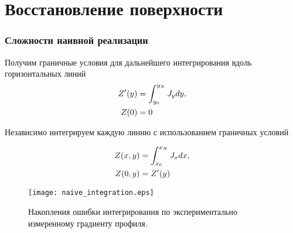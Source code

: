 \documentclass{beamer}
\begin{document}
\section{Восстановление поверхности}
\begin{frame}
    \sectionpage
\end{frame}

\begin{frame}[c,allowframebreaks]
    \frametitle{Сложности наивной реализации}

    Получим граничные условия для дальнейшего интегрирования вдоль горизонтальных линий
    \begin{equation*}
        \begin{aligned}
            Z'(y) & = \int_{y_0}^{y_N} \mathbf{\emph{J}}_y dy, \\
            Z(0)  & = 0
        \end{aligned}
    \end{equation*}

    Независимо интегрируем каждую линию с использованием граничных условий

    \begin{equation*}
        \begin{aligned}
            Z(x, y) & = \int_{x_0}^{x_N} \mathbf{\emph{J}}_x dx, \\
            Z(0, y) & = Z'(y)
        \end{aligned}
    \end{equation*}

    \framebreak

    \begin{figure}
        \texttt{[image: naive\_integration.eps]}
        \caption{Накопления ошибки интегрирования по экспериментально измеренному градиенту
        профиля.\label{fig:naive_integration}}
    \end{figure}
\end{frame}
\end{document}
